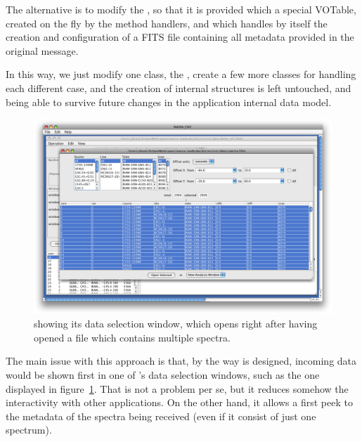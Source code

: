 			The alternative is to modify the
			, so that it is provided
			which a special VOTable, created on the fly by the
			 method handlers, and which handles
			by itself the creation and configuration of a FITS
			file containing all metadata provided in the
			original message.
			
			In this way, we just modify one class, the
			, create a few more
			classes for handling each different case, and the
			creation of internal structures is left untouched,
			and being able to survive future changes in the
			application internal data model.
			
			\begin{figure}[tbp]
				\centering
					\includegraphics[height=0.4\textheight]
					{fig/massaSelectionWindow.png}
				\caption[\massa's data selection window]
				{\massa showing its data selection window,
				which opens right after having opened a file
				which contains multiple spectra.}
				\label{fig:fig_massaSelectionWindow}
			\end{figure}
			
			The main issue with this approach is that, by the
			way \massa{} is designed, incoming data would be
			shown first in one of \massa's data selection
			windows, such as the one displayed in
			figure~\ref{fig:fig_massaSelectionWindow}. That
			is not a problem per se, but it reduces somehow
			the interactivity with other applications. On the
			other hand, it allows a first peek to the metadata
			of the spectra being received (even if it consist
			of just one spectrum).
			
		
